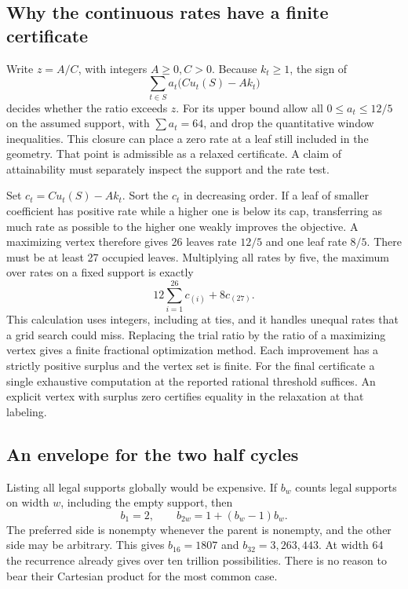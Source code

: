 \documentclass[12pt,letterpaper]{article}
\begin{document}
\subsection{Why the continuous rates have a finite certificate}

Write \(z=A/C\), with integers \(A\geq0,C>0\). Because \(k_t\ge1\), the sign of
\[
           \sum_{t\in S} a_t\bigl(Cu_t(S)-Ak_t\bigr)
\]
decides whether the ratio exceeds \(z\). For its upper bound allow all \(0\le a_t\le12/5\) on the assumed support, with \(\sum a_t=64\), and drop the quantitative window inequalities. This closure can place a zero rate at a leaf still included in the geometry. That point is admissible as a relaxed certificate. A claim of attainability must separately inspect the support and the rate test.

Set \(c_t=Cu_t(S)-Ak_t\). Sort the \(c_t\) in decreasing order. If a leaf of smaller coefficient has positive rate while a higher one is below its cap, transferring as much rate as possible to the higher one weakly improves the objective. A maximizing vertex therefore gives 26 leaves rate \(12/5\) and one leaf rate \(8/5\). There must be at least 27 occupied leaves. Multiplying all rates by five, the maximum over rates on a fixed support is exactly
\[
              12\sum_{i=1}^{26}c_{(i)}+8c_{(27)} .
\]
This calculation uses integers, including at ties, and it handles unequal rates that a grid search could miss. Replacing the trial ratio by the ratio of a maximizing vertex gives a finite fractional optimization method. Each improvement has a strictly positive surplus and the vertex set is finite. For the final certificate a single exhaustive computation at the reported rational threshold suffices. An explicit vertex with surplus zero certifies equality in the relaxation at that labeling.

\subsection{An envelope for the two half cycles}

Listing all legal supports globally would be expensive. If \(b_w\) counts legal supports on width \(w\), including the empty support, then
\[
                  b_1=2,\qquad b_{2w}=1+(b_w-1)b_w .
\]
The preferred side is nonempty whenever the parent is nonempty, and the other side may be arbitrary. This gives \(b_{16}=1807\) and \(b_{32}=3{,}263{,}443\). At width 64 the recurrence already gives over ten trillion possibilities. There is no reason to bear their Cartesian product for the most common case.
\end{document}
